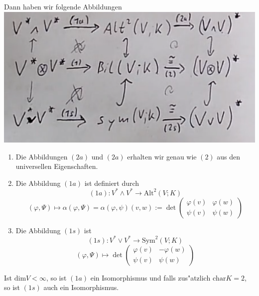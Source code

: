 \documentclass[11pt, a4paper]{article}
\begin{document}
Dann haben wir folgende Abbildungen 
\\
\includegraphics[scale=0.4]{Diagramm}
\\
\begin{enumerate}
\item Die Abbildungen $(2a)$ und $(2a)$ erhalten wir genau wie $(2)$ aus den universellen Eigenschaften.
\item Die Abbildung $(1a)$ ist definiert durch 
$$
(1a): V^* \wedge V^* \rightarrow \mathrm{Alt}^2(V;K)
$$
$$
(\varphi, \Psi) \mapsto \alpha (\varphi, \Psi) = 
\alpha(\varphi, \psi)(v, w):=\operatorname{det}\left(\begin{array}{cc}\varphi(v) & \varphi(w) \\ \psi(v) & \psi(w)\end{array}\right)
$$
\item Die Abbildung $(1s)$ ist
$$
(1s): V^* \vee V^* \rightarrow \mathrm{Sym}^2 (V;K)
$$
$$
(\varphi, \Psi) \mapsto \operatorname{det}\left(\begin{array}{cc}\varphi(v) & - \varphi(w) \\ \psi(v) & \psi(w)\end{array}\right)
$$
\end{enumerate}

\begin{theorem}
Ist $\mathrm{dim}V < \infty$, so ist $(1a)$ ein Isomorphismus und falls zus"atzlich $\mathrm{char}K = 2$, so ist $(1s)$ auch ein Isomorphismus.
\end{theorem}
\end{document}
